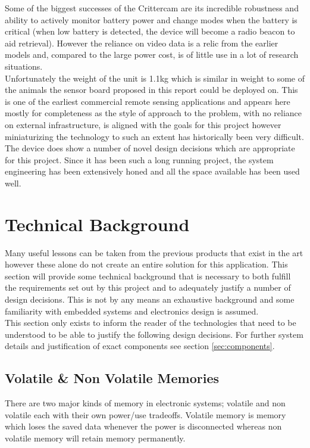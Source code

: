 \documentclass[12pt,openany,a4paper]{book}
\begin{document}
			 Some of the biggest successes of the Crittercam are its incredible robustness and ability to actively monitor battery power and change modes when the battery is critical (when low battery is detected, the device will become a radio beacon to aid retrieval). However the reliance on video data is a relic from the earlier models and, compared to the large power cost, is of little use in a lot of research situations.\\
			 
			  Unfortunately the weight of the unit is 1.1kg which is similar in weight to some of the animals the sensor board proposed in this report could be deployed on. This is one of the earliest commercial remote sensing applications and appears here mostly for completeness as the style of approach to the problem, with no reliance on external infrastructure, is aligned with the goals for this project however miniaturizing the technology to such an extent has historically been very difficult.\\
			  
			  The device does show a number of novel design decisions which are appropriate for this project. Since it has been such a long running project, the system engineering has been extensively honed and all the space available has been used well. 
	\newpage
	\section{Technical Background}
		Many useful lessons can be taken from the previous products that exist in the art however these alone do not create an entire solution for this application. This section will provide some technical background that is necessary to both fulfill the requirements set out by this project and to adequately justify a number of design decisions. This is not by any means an exhaustive background and some familiarity with embedded systems and electronics design is assumed. \\
		
		 This section only exists to inform the reader of the technologies that need to be understood to be able to justify the following design decisions. For further system details and justification of exact components see section \ref{sec:components}. 
			
		\subsection{Volatile \& Non Volatile Memories} \label{sec:volatile}
			There are two major kinds of memory in electronic systems; volatile and non volatile each with their own power/use tradeoffs. Volatile memory is memory which loses the saved data whenever the power is disconnected whereas non volatile memory will retain memory permanently. \\
			
\end{document}
